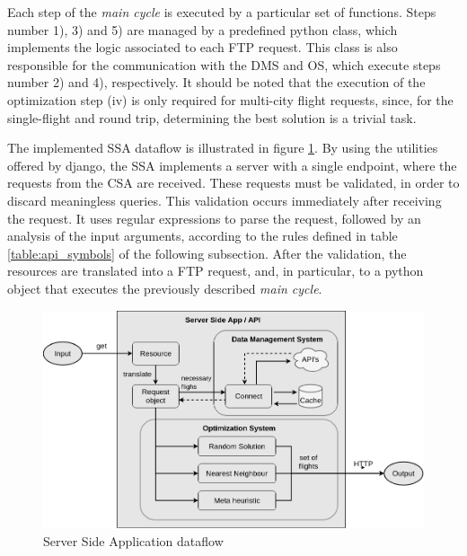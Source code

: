 Each step of the \textit{main cycle} is executed by a particular set of functions. Steps number 1), 3) and 5) are managed by a predefined python class, which implements the logic associated to each FTP request. This class is also responsible for the communication with the DMS and OS, which execute steps number 2) and 4), respectively. It should be noted that the execution of the optimization step (iv) is only required for multi-city flight requests, since, for the single-flight and round trip, determining the best solution is a trivial task.



The implemented SSA dataflow is illustrated in figure \ref{fig:api_structure}. By using the utilities offered by django, the SSA implements a server with a single endpoint, where the requests from the CSA are received. These requests must be validated, in order to discard meaningless queries. This validation occurs immediately after receiving the request. It uses regular expressions to parse the request, followed by an analysis of the input arguments, according to the rules defined in table \ref{table:api_symbols} of the following subsection. After the validation, the resources are translated into a FTP request, and, in particular, to a python object that executes the previously described \textit{main cycle}.



\begin{figure}[htpb]
  \centering
  \includegraphics[width=\textwidth]{./Figures/system_implementation/api.png}
  \caption{Server Side Application dataflow}
  \label{fig:api_structure}  
\end{figure}